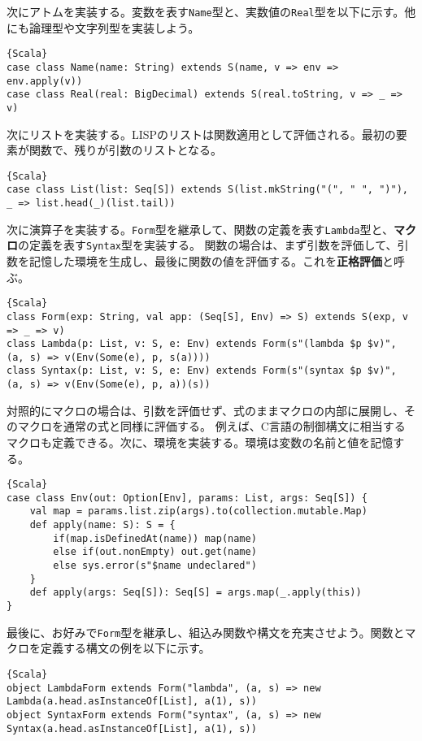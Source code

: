 \documentclass[10pt,a4paper]{book}
\begin{document}
次にアトムを実装する。変数を表す\texttt{Name}型と、実数値の\texttt{Real}型を以下に示す。他にも論理型や文字列型を実装しよう。

\begin{Verbatim}{Scala}
case class Name(name: String) extends S(name, v => env => env.apply(v))
case class Real(real: BigDecimal) extends S(real.toString, v => _ => v)
\end{Verbatim}

次にリストを実装する。LISPのリストは関数適用として評価される。最初の要素が関数で、残りが引数のリストとなる。

\begin{Verbatim}{Scala}
case class List(list: Seq[S]) extends S(list.mkString("(", " ", ")"), _ => list.head(_)(list.tail))
\end{Verbatim}

次に演算子を実装する。\texttt{Form}型を継承して、関数の定義を表す\texttt{Lambda}型と、\textbf{マクロ}の定義を表す\texttt{Syntax}型を実装する。
関数の場合は、まず引数を評価して、引数を記憶した環境を生成し、最後に関数の値を評価する。これを\textbf{正格評価}と呼ぶ。

\begin{Verbatim}{Scala}
class Form(exp: String, val app: (Seq[S], Env) => S) extends S(exp, v => _ => v)
class Lambda(p: List, v: S, e: Env) extends Form(s"(lambda $p $v)", (a, s) => v(Env(Some(e), p, s(a))))
class Syntax(p: List, v: S, e: Env) extends Form(s"(syntax $p $v)", (a, s) => v(Env(Some(e), p, a))(s))
\end{Verbatim}

対照的にマクロの場合は、引数を評価せず、式のままマクロの内部に展開し、そのマクロを通常の式と同様に評価する。
例えば、C言語の制御構文に相当するマクロも定義できる。次に、環境を実装する。環境は変数の名前と値を記憶する。

\begin{Verbatim}{Scala}
case class Env(out: Option[Env], params: List, args: Seq[S]) {
	val map = params.list.zip(args).to(collection.mutable.Map)
	def apply(name: S): S = {
		if(map.isDefinedAt(name)) map(name)
		else if(out.nonEmpty) out.get(name)
		else sys.error(s"$name undeclared")
	}
	def apply(args: Seq[S]): Seq[S] = args.map(_.apply(this)) 
}
\end{Verbatim}

最後に、お好みで\texttt{Form}型を継承し、組込み関数や構文を充実させよう。関数とマクロを定義する構文の例を以下に示す。

\begin{Verbatim}{Scala}
object LambdaForm extends Form("lambda", (a, s) => new Lambda(a.head.asInstanceOf[List], a(1), s)) 
object SyntaxForm extends Form("syntax", (a, s) => new Syntax(a.head.asInstanceOf[List], a(1), s)) 
\end{Verbatim}
\end{document}
